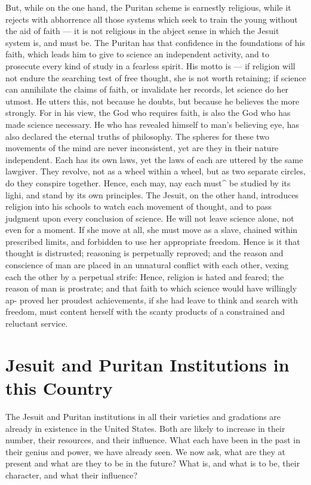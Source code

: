\documentclass[]{book}
\begin{document}
But, while on the one hand, the Puritan scheme is earnestly religious, while it rejects with abhorrence all those systems which seek to train the young without the aid of faith --- it is not religious in the abject sense in which the Jesuit system is, and must be. The Puritan has that confidence in the foundations of his faith, which leads him to give to science an independent activity, and to prosecute every kind of study in a fearless spirit. His motto is --- if religion will not endure the searching test of free thought, she is not worth retaining; if science can annihilate the claims of faith, or invalidate her records, let science do her utmost. He utters this, not because he doubts, but because he believes the more strongly. For in his view, the God who requires faith, is also the God who has made science necessary. He who has revealed himself to man's believing eye, has also declared the eternal truths of philosophy. The spheres for these two movements of the mind are never inconsistent, yet are they in their nature independent. Each has its own laws, yet the laws of each are uttered by the same lawgiver. They revolve, not as a wheel within a wheel, but as two separate circles, do they conspire together. Hence, each may, nay each must\^{} be studied by its lighi, and stand by its own principles. The Jesuit, on the other hand, introduces religion into his schools to watch each movement of thought, and to pass judgment upon every conclusion of science. He will not leave science alone, not even for a moment. If she move at all, she must move as a slave, chained within prescribed limits, and forbidden to use her appropriate freedom. Hence is it that thought is distrusted; reasoning is perpetually reproved; and the reason and conscience of man are placed in an unnatural conflict with each other, vexing each the other by a perpetual strife: Hence, religion is hated and feared; the reason of man is prostrate; and that faith to which science would have willingly ap- proved her proudest achievements, if she had leave to think and search with freedom, must content herself with the scanty products of a constrained and reluctant service.

\hypertarget{jesuit-and-puritan-institutions-in-this-country}{%
\chapter{Jesuit and Puritan Institutions in this Country}\label{jesuit-and-puritan-institutions-in-this-country}}

The Jesuit and Puritan institutions in all their varieties and gradations are already in existence in the United States. Both are likely to increase in their number, their resources, and their influence. What each have been in the past in their genius and power, we have already seen. We now ask, what are they at present and what are they to be in the future? What is, and what is to be, their character, and what their influence?
\end{document}
